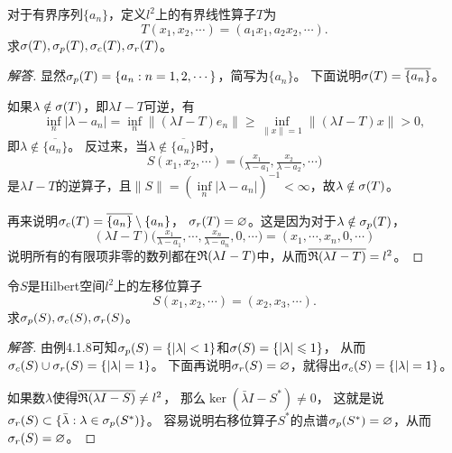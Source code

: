 \begin{6}
    对于有界序列$\{a_n\}$，定义$l^2$上的有界线性算子$T$为
    \[T(x_1,x_2,\cdots)=(a_1x_1,a_2x_2,\cdots).\]
    求$\sigma(T),\sigma_p(T),\sigma_c(T),\sigma_r(T)$。
\end{6}
\begin{proof}[解答]
    显然$\sigma_p(T)=\{a_n:n=1,2,\cdots\}$，简写为$\{a_n\}$。
    下面说明$\sigma(T)=\overline{\{a_n\}}$。

    如果$\lambda\notin\sigma(T)$，即$\lambda I-T$可逆，有
    \[\inf_n|\lambda-a_n|=\inf_n\|(\lambda I-T)e_n\|
    \geqslant\inf_{\|x\|=1}\|(\lambda I-T)x\|>0,\]
    即$\lambda\notin\overline{\{a_n\}}$。
    反过来，当$\lambda\notin\overline{\{a_n\}}$时，
    \[S(x_1,x_2,\cdots)=\big(\tfrac{x_1}{\lambda-a_1},\tfrac{x_2}{\lambda-a_2},\cdots\big)\]
    是$\lambda I-T$的逆算子，且$\|S\|=\left(\inf\limits_n|\lambda-a_n|\right)^{-1}<\infty$，故$\lambda\notin\sigma(T)$。

    再来说明$\sigma_c(T)=\overline{\{a_n\}}\setminus\{a_n\}$，
    $\sigma_r(T)=\varnothing$。这是因为对于$\lambda\notin\sigma_p(T)$，
    \[(\lambda I-T)\big(\tfrac{x_1}{\lambda-a_1},\cdots,\tfrac{x_n}{\lambda-a_n},0,\cdots\big)=(x_1,\cdots,x_n,0,\cdots)\]
    说明所有的有限项非零的数列都在$\mathfrak{R}(\lambda I-T)$中，从而$\overline{\mathfrak{R}(\lambda I-T)}=l^2$。
\end{proof}

\begin{7}
    令$S$是Hilbert空间$l^2$上的左移位算子
    \[S(x_1,x_2,\cdots)=(x_2,x_3,\cdots).\]
    求$\sigma_p(S),\sigma_c(S),\sigma_r(S)$。
\end{7}
\begin{proof}[解答]
    由例4.1.8可知$\sigma_p(S)=\{|\lambda|<1\}$和$\sigma(S)=\{|\lambda|\leqslant1\}$，
    从而$\sigma_c(S)\cup\sigma_r(S)=\{|\lambda|=1\}$。
    下面再说明$\sigma_r(S)=\varnothing$，就得出$\sigma_c(S)=\{|\lambda|=1\}$。

    如果数$\lambda$使得$\overline{\mathfrak{R}(\lambda I-S)} \ne l^2$，
    那么$\ker(\bar{\lambda}I-S^*)\ne0$，
    这就是说$\sigma_r(S)\subset\{\bar{\lambda}:\lambda\in\sigma_p(S^*)\}$。
    容易说明右移位算子$S^*$的点谱$\sigma_p(S^*)=\varnothing$，从而$\sigma_r(S)=\varnothing$。
\end{proof}

